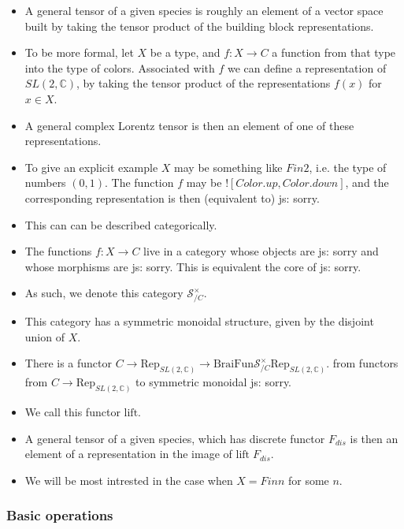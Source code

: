 \documentclass[a4paper, 11pt]{article}
\newcommand{\js}[1]{ {\color{magenta} js:  #1}}
\begin{document}
\begin{itemize} 
\item A general tensor of a given species is roughly an element of a vector space 
  built by taking the tensor product of the building block representations. 
\item To be more formal, let $X$ be a type, and $f : X \to C$ a function from that type 
  into the type of colors. 
  Associated with $f$ we can define a representation of $SL(2, \mathbb{C})$, 
  by taking the tensor product of the representations $f(x)$ for $x \in X$. 
\item A general complex Lorentz tensor is then an element of one of these representations.
\item To give an explicit example $X$ may be something like $Fin 2$, i.e. the type of 
  numbers $(0,1)$. The function $f$ may be $![Color.up, Color.down]$, and the corresponding 
  representation is then (equivalent to) \js{sorry}. 
\item This can can be described categorically. 
\item The functions $f :X \to C$ live in a category whose objects are \js{sorry} and 
 whose morphisms are \js{sorry}. This is equivalent the core of \js{sorry}. 
\item As such, we denote this category $\mathcal{S}_{/C}^\times$.
\item This category has a symmetric monoidal structure, given by the disjoint union of $X$.
\item There is a functor $C \to \mathrm{Rep}_{SL(2, \mathbb{C})} \to 
  \mathrm{BraiFun} \mathcal{S}_{/C}^\times \mathrm{Rep}_{SL(2, \mathbb{C})}$.
  from functors from $C \to \mathrm{Rep}_{SL(2, \mathbb{C})} $ to symmetric 
  monoidal \js{sorry}.
\item We call this functor $\mathrm{lift}$. 
\item A general tensor of a given species, which has discrete functor $F_{dis}$ is then 
 an element of a representation in the image of $\mathrm{lift}\; F_{dis}$.
\item We will be most intrested in the case when $X = Fin n$ for some $n$.
\end{itemize}

\subsubsection{Basic operations}
\end{document}
